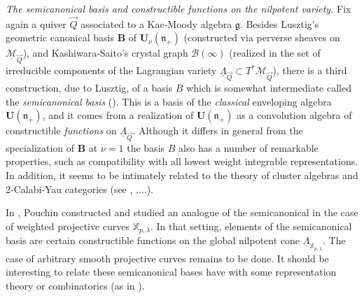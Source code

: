 \documentclass[a4paper,10pt]{amsart}
\def\U{\mathbf{U}}
\def\n{\mathfrak{n}}
\numberwithin{equation}{section}
\begin{document}
\vspace{.2in}

\noindent
\textit{The semicanonical basis and constructible functions on the nilpotent variety.} Fix again a quiver $\vec{Q}$ associated to a Kac-Moody algebra 
$\mathfrak{g}$. Besides Lusztig's geometric canonical basis $\mathbf{B}$
of $\U_\nu(\n_+)$ (constructed via perverse sheaves on $\underline{\mathcal{M}}_{\vec{Q}}$), and Kashiwara-Saito's crystal graph $\mathcal{B}(\infty)$ (realized in the set of irreducible components of the Lagrangian variety $\underline{\Lambda}_{\vec{Q}} \subset T^* \underline{\mathcal{M}}_{\vec{Q}}$), there is a third construction, due to Lusztig, of a basis $B$ which is somewhat intermediate called the \textit{semicanonical basis} (\cite{LUsemi}). This is a basis of the \textit{classical} enveloping algebra $\U(\n_+)$, and it comes from a realization of $\U(\n_+)$ as a convolution algebra of constructible \textit{functions} on $\underline{\Lambda}_{\vec{Q}}$. Although it differs in general from the specialization of $\mathbf{B}$ at $\nu=1$ the basis $B$ also has a number of remarkable properties, such as compatibility with all lowest weight integrable representations. In addition, it seems to be intimately related to the theory of cluster algebras and 2-Calabi-Yau categories (see \cite{CGL}, \cite{CGL2},...).

In \cite{Pouchin}, Pouchin constructed and studied an analogue of the semicanonical in the case of weighted projective curves $\mathbb{X}_{p,\lambda}$. In that setting, elements of the semicanonical basis are certain constructible functions on the global nilpotent cone $\underline{\Lambda}_{\mathbb{X}_{p,\lambda}}$. The case of arbitrary smooth projective curves remains to be done. It should be interesting to relate these semicanonical bases have with some representation theory or combinatorics (as in \cite{CGL}). 

\vspace{.2in}
\end{document}
